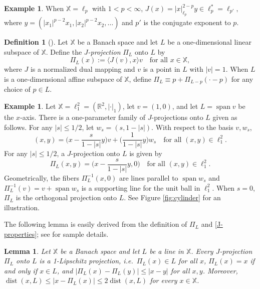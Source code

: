 \documentclass[12pt]{amsart}
\numberwithin{equation}{section}
\theoremstyle{plain}
\newtheorem{lemma}[theorem]{Lemma}
\theoremstyle{definition}
\newtheorem{definition}[theorem]{Definition}
\newtheorem{example}[theorem]{Example}
\newcommand{\Span}{\mathop\mathrm{span}\nolimits}
\def\RR{\mathbb{R}}
\def\XX{{\mathbb{X}}}
\newcommand{\dist}{\mathop\mathrm{dist}\nolimits}
\numberwithin{figure}{section}
\begin{document}
\begin{example}When $\XX=\ell_p$ with $1<p<\infty$, $J(x)= |x|_{\ell_p}^{2-p}y\in \ell_p^*=\ell_{p'},$ where $y=(|x_1|^{p-2}x_1,|x_2|^{p-2}x_2,\dots)$ and $p'$ is the conjugate exponent to $p$.\end{example}

\begin{definition}[{\cite[Definition 3.31]{ENV-Banach}}] \label{def:J-proj}
Let $\XX$ be a Banach space and let $L$ be a one-dimensional linear subspace of $\XX$. Define the \emph{$J$-projection} $\Pi_L$ onto $L$ by
\begin{equation}\Pi_{L}(x) := \langle J(v), x \rangle v\quad\text{for all }x\in\XX,\end{equation} where $J$ is a normalized dual mapping and $v$ is a point in $L$ with $|v|=1$. When $L$ is a one-dimensional affine subspace of $\XX$, define $\Pi_L\equiv p+\Pi_{L-p}(\cdot-p)$ for any choice of $p\in L$.
\end{definition}

\begin{example} Let $\XX=\ell_1^2=(\RR^2,|\cdot|_1)$, let $v=(1,0)$, and let $L=\Span v$ be the $x$-axis. There is a one-parameter family of $J$-projections onto $L$ given as follows. For any $|s|\leq 1/2$, let $w_s=(s,1-|s|)$. With respect to the basis $v,w_s$, $$(x,y)=\Big(x-\frac{s}{1-|s|}y\Big)v+\Big(\frac{1}{1-|s|}y\Big)w_s\quad\text{for all }(x,y)\in\ell^2_1.$$ For any $|s|\leq 1/2$, a $J$-projection onto $L$ is given by $$\Pi_L(x,y)=\Big(x-\frac{s}{1-|s|}y,0\Big)\quad\text{for all }(x,y)\in\ell^2_1.$$ Geometrically, the fibers $\Pi_L^{-1}(x,0)$ are lines parallel to $\Span w_s$ and $\Pi_L^{-1}(v)=v+\Span w_s$ is a supporting line for the unit ball in $\ell_1^2$. When $s=0$, $\Pi_L$ is the orthogonal projection onto $L$. See Figure \ref{fig:cylinder} for an illustration.\end{example}

The following lemma is easily derived from the definition of $\Pi_L$ and \eqref{J-properties}; see \cite[Lemma 2.17]{Badger-McCurdy-1} for sample details.

\begin{lemma}\label{j-proj facts} Let $\XX$ be a Banach space and let $L$ be a line in $\XX$. Every $J$-projection $\Pi_L$ onto $L$ is a 1-Lipschitz projection, i.e.~$\Pi_L(x)\in L$ for all $x$, $\Pi_L(x)=x$ if and only if $x\in L$, and $|\Pi_L(x)-\Pi_L(y)|\leq |x-y|$ for all $x,y$. Moreover, $\dist(x,L)\leq |x-\Pi_L(x)|\leq 2\dist(x,L)$ for every $x\in\XX$.
\end{lemma}
\end{document}
